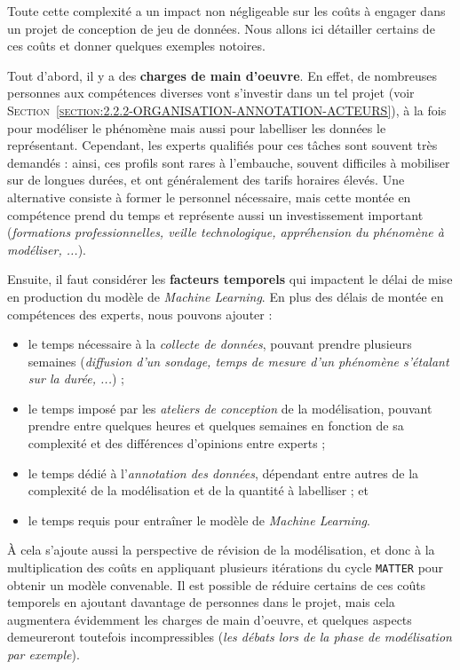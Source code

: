			Toute cette complexité a un impact non négligeable sur les coûts à engager dans un projet de conception de jeu de données.
			Nous allons ici détailler certains de ces coûts et donner quelques exemples notoires.
			
			Tout d'abord, il y a des \textbf{charges de main d'oeuvre}.
			En effet, de nombreuses personnes aux compétences diverses vont s'investir dans un tel projet (voir \textsc{Section~\ref{section:2.2.2-ORGANISATION-ANNOTATION-ACTEURS}}), à la fois pour modéliser le phénomène mais aussi pour labelliser les données le représentant.
			Cependant, les experts qualifiés pour ces tâches sont souvent très demandés : ainsi, ces profils sont rares à l'embauche, souvent difficiles à mobiliser sur de longues durées, et ont généralement des tarifs horaires élevés.
			Une alternative consiste à former le personnel nécessaire, mais cette montée en compétence prend du temps et représente aussi un investissement important (\textit{formations professionnelles, veille technologique, appréhension du phénomène à modéliser, ...}).
			
			Ensuite, il faut considérer les \textbf{facteurs temporels} qui impactent le délai de mise en production du modèle de \textit{Machine Learning}.
			En plus des délais de montée en compétences des experts, nous pouvons ajouter :
			\begin{itemize}
				\item le temps nécessaire à la \textit{collecte de données}, pouvant prendre plusieurs semaines (\textit{diffusion d'un sondage, temps de mesure d'un phénomène s'étalant sur la durée, ...}) ;
				\item le temps imposé par les \textit{ateliers de conception} de la modélisation, pouvant prendre entre quelques heures et quelques semaines en fonction de sa complexité et des différences d'opinions entre experts ;
				\item le temps dédié à l'\textit{annotation des données}, dépendant entre autres de la complexité de la modélisation et de la quantité à labelliser ; et
				\item le temps requis pour entraîner le modèle de \textit{Machine Learning}.
			\end{itemize}
			À cela s'ajoute aussi la perspective de révision de la modélisation, et donc à la multiplication des coûts en appliquant plusieurs itérations du cycle \texttt{MATTER} pour obtenir un modèle convenable.
			Il est possible de réduire certains de ces coûts temporels en ajoutant davantage de personnes dans le projet, mais cela augmentera évidemment les charges de main d'oeuvre, et quelques aspects demeureront toutefois incompressibles (\textit{les débats lors de la phase de modélisation par exemple}).
			
